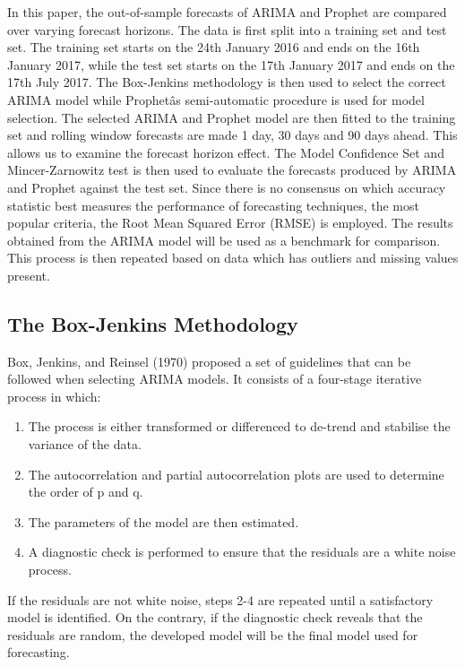 \documentclass[12pt,a4paper]{article}
\numberwithin{equation}{section}
\numberwithin{figure}{section}
\numberwithin{table}{section}
\def\tightlist{}
\begin{document}
In this paper, the out-of-sample forecasts of ARIMA and Prophet are
compared over varying forecast horizons. The data is first split into a
training set and test set. The training set starts on the 24th January
2016 and ends on the 16th January 2017, while the test set starts on the
17th January 2017 and ends on the 17th July 2017. The Box-Jenkins
methodology is then used to select the correct ARIMA model while
Prophetâs semi-automatic procedure is used for model selection. The
selected ARIMA and Prophet model are then fitted to the training set and
rolling window forecasts are made 1 day, 30 days and 90 days ahead. This
allows us to examine the forecast horizon effect. The Model Confidence
Set and Mincer-Zarnowitz test is then used to evaluate the forecasts
produced by ARIMA and Prophet against the test set. Since there is no
consensus on which accuracy statistic best measures the performance of
forecasting techniques, the most popular criteria, the Root Mean Squared
Error (RMSE) is employed. The results obtained from the ARIMA model will
be used as a benchmark for comparison. This process is then repeated
based on data which has outliers and missing values present.

\subsection{The Box-Jenkins
Methodology}\label{the-box-jenkins-methodology}

Box, Jenkins, and Reinsel (1970) proposed a set of guidelines that can
be followed when selecting ARIMA models. It consists of a four-stage
iterative process in which:

\begin{enumerate}
\def\labelenumi{\arabic{enumi}.}
\tightlist
\item
  The process is either transformed or differenced to de-trend and
  stabilise the variance of the data.
\item
  The autocorrelation and partial autocorrelation plots are used to
  determine the order of p and q.
\item
  The parameters of the model are then estimated.
\item
  A diagnostic check is performed to ensure that the residuals are a
  white noise process.
\end{enumerate}

If the residuals are not white noise, steps 2-4 are repeated until a
satisfactory model is identified. On the contrary, if the diagnostic
check reveals that the residuals are random, the developed model will be
the final model used for forecasting.
\end{document}
